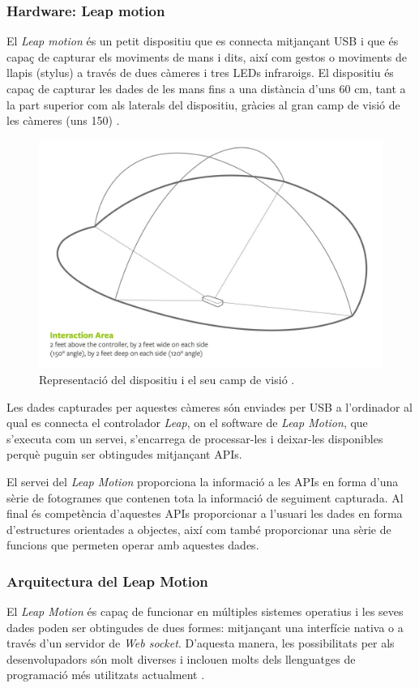\documentclass[12pt,a4paper,catalan]{article}
\begin{document}
	\subsubsection{Hardware: Leap motion}
	El \textit{Leap motion} és un petit dispositiu que es connecta mitjançant USB i que és capaç de capturar els moviments de mans i dits, així com gestos o moviments de llapis (stylus) a través de dues càmeres i tres LEDs infraroigs. El dispositiu és capaç de capturar les dades de les mans fins a una distància d'uns 60 cm, tant a la part superior com als laterals del dispositiu, gràcies al gran camp de visió de les càmeres (uns 150\textdegree) \cite{leapcharacteristics}.
	\begin{figure}[H]
		\includegraphics[width=\textwidth,keepaspectratio]{leap-motion-interaction-area.png}
		\centering
		\caption{Representació del dispositiu i el seu camp de visió \protect\cite{leapcharacteristics}.}
	\end{figure}
	Les dades capturades per aquestes càmeres són enviades per USB a l'ordinador al qual es connecta el controlador \textit{Leap}, on el software de \textit{Leap Motion}, que s'executa com un servei, s'encarrega de processar-les i deixar-les disponibles perquè puguin ser obtingudes mitjançant APIs.
	
	El servei del \textit{Leap Motion} proporciona la informació a les APIs en forma d'una sèrie de fotogrames que contenen tota la informació de seguiment capturada. Al final és competència d'aquestes APIs proporcionar a l'usuari les dades en forma d'estructures orientades a objectes, així com també proporcionar una sèrie de funcions que permeten operar amb aquestes dades.
	\subsubsection{Arquitectura del Leap Motion}
	El \textit{Leap Motion} és capaç de funcionar en múltiples sistemes operatius i les seves dades poden ser obtingudes de dues formes: mitjançant una interfície nativa o a través d'un servidor de \textit{Web socket}. D'aquesta manera, les possibilitats per als desenvolupadors són molt diverses i inclouen molts dels llenguatges de programació més utilitzats actualment \cite{leapsdkdocs}.
	
\end{document}
